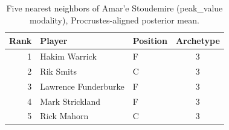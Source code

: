 \begin{table}[htbp]
  \centering\small
  \begin{tabular}{rllc}
    \toprule
    Rank & Player & Position & Archetype \\
    \midrule
    1 & Hakim Warrick & F & 3 \\
    2 & Rik Smits & C & 3 \\
    3 & Lawrence Funderburke & F & 3 \\
    4 & Mark Strickland & F & 3 \\
    5 & Rick Mahorn & C & 3 \\
    \bottomrule
  \end{tabular}
  \caption{Five nearest neighbors of Amar'e Stoudemire (peak_value modality), Procrustes-aligned posterior mean.}
  \label{tab:Amar_e_Stoudemire_neighbors_peak_value}
\end{table}

